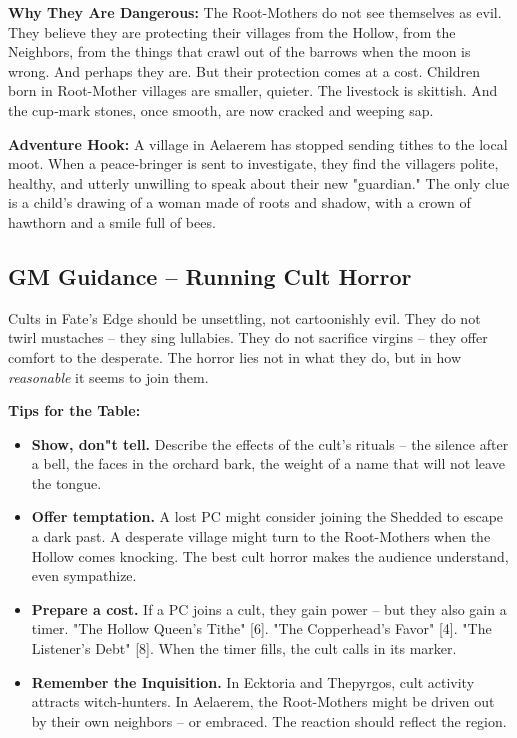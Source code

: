 \documentclass[10pt,a5paper]{book}
\begin{document}
\textbf{Why They Are Dangerous:} The Root-Mothers do not see themselves as evil. They believe they are protecting their villages from the Hollow, from the Neighbors, from the things that crawl out of the barrows when the moon is wrong. And perhaps they are. But their protection comes at a cost. Children born in Root-Mother villages are smaller, quieter. The livestock is skittish. And the cup‑mark stones, once smooth, are now cracked and weeping sap.

\textbf{Adventure Hook:} A village in Aelaerem has stopped sending tithes to the local moot. When a peace-bringer is sent to investigate, they find the villagers polite, healthy, and utterly unwilling to speak about their new "guardian." The only clue is a child's drawing of a woman made of roots and shadow, with a crown of hawthorn and a smile full of bees.

\subsection{GM Guidance -- Running Cult Horror}

Cults in Fate's Edge should be unsettling, not cartoonishly evil. They do not twirl mustaches -- they sing lullabies. They do not sacrifice virgins -- they offer comfort to the desperate. The horror lies not in what they do, but in how \textit{reasonable} it seems to join them.

\textbf{Tips for the Table:}
\begin{itemize}
    \item \textbf{Show, don"t tell.} Describe the effects of the cult's rituals -- the silence after a bell, the faces in the orchard bark, the weight of a name that will not leave the tongue.
    \item \textbf{Offer temptation.} A lost PC might consider joining the Shedded to escape a dark past. A desperate village might turn to the Root-Mothers when the Hollow comes knocking. The best cult horror makes the audience understand, even sympathize.
    \item \textbf{Prepare a cost.} If a PC joins a cult, they gain power -- but they also gain a timer. "The Hollow Queen's Tithe" [6]. "The Copperhead's Favor" [4]. "The Listener's Debt" [8]. When the timer fills, the cult calls in its marker.
    \item \textbf{Remember the Inquisition.} In Ecktoria and Thepyrgos, cult activity attracts witch‑hunters. In Aelaerem, the Root-Mothers might be driven out by their own neighbors -- or embraced. The reaction should reflect the region.
\end{itemize}
\end{document}
